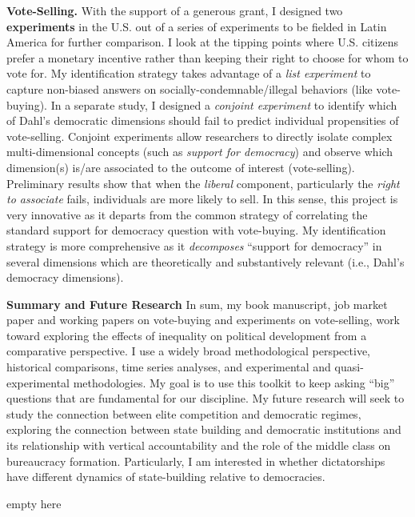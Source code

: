 \documentclass[11pt]{letter} %
\begin{document}
\begin{letter}{}
{\bf Vote-Selling.} With the support of a generous grant, I designed two {\bf experiments} in the U.S. out of a series of experiments to be fielded in Latin America for further comparison. I look at the tipping points where U.S. citizens prefer a monetary incentive rather than keeping their right to choose for whom to vote for. My identification strategy takes advantage of a \emph{list experiment} to capture non-biased answers on socially-condemnable/illegal behaviors (like vote-buying). In a separate study, I designed a \emph{conjoint experiment} to identify which of Dahl's democratic dimensions should fail to predict individual propensities of vote-selling. Conjoint experiments allow researchers to directly isolate complex multi-dimensional concepts (such as \emph{support for democracy}) and observe which dimension(s) is/are associated to the outcome of interest (vote-selling). Preliminary results show that when the \emph{liberal} component, particularly the \emph{right to associate} fails, individuals are more likely to sell. In this sense, this project is very innovative as it departs from the common strategy of correlating the standard support for democracy question with vote-buying. My identification strategy is more comprehensive as it \emph{decomposes} ``support for democracy'' in several dimensions which are theoretically and substantively relevant (i.e., Dahl's democracy dimensions). 


{\bf Summary and Future Research} In sum, my book manuscript, job market paper and working papers on vote-buying and experiments on vote-selling, work toward exploring the effects of inequality on political development from a comparative perspective. I use a widely broad methodological perspective, historical comparisons, time series analyses, and experimental and quasi-experimental methodologies. My goal is to use this toolkit to keep asking ``big'' questions that are fundamental for our discipline. My future research will seek to study the connection between elite competition and democratic regimes, exploring the connection between state building and democratic institutions and its relationship with vertical accountability and the role of the middle class on bureaucracy formation. Particularly, I am interested in whether dictatorships have different dynamics of state-building relative to democracies.\vspace{-10cm}

\closing{{\color{white}empty here}}


{\color{white}\encl{}}


\end{letter}
\end{document}
